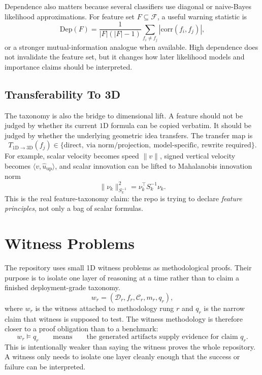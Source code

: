 \documentclass[11pt]{article}
\begin{document}
Dependence also matters because several classifiers use diagonal or naive-Bayes
likelihood approximations. For feature set \(F \subseteq \mathcal{F}\), a
useful warning statistic is
\begin{equation}
\mathrm{Dep}(F)
=
\frac{1}{|F|(|F|-1)}
\sum_{f_i \neq f_j}
\left|
\mathrm{corr}(f_i, f_j)
\right|,
\end{equation}
or a stronger mutual-information analogue when available. High dependence does
not invalidate the feature set, but it changes how later likelihood models and
importance claims should be interpreted.

\subsection*{Transferability To 3D}
The taxonomy is also the bridge to dimensional lift. A feature should not be
judged by whether its current \(1\text{D}\) formula can be copied verbatim.
It should be judged by whether the underlying geometric idea transfers. The
transfer map is
\begin{equation}
T_{1\mathrm{D}\rightarrow 3\mathrm{D}}(f_j)
\in
\{\text{direct},\ \text{via norm/projection},\ \text{model-specific},\ \text{rewrite required}\}.
\end{equation}
For example, scalar velocity becomes speed \(\|v\|\), signed vertical velocity
becomes \(\langle v, \hat{u}_{\mathrm{up}}\rangle\), and scalar innovation can
be lifted to Mahalanobis innovation norm
\begin{equation}
\|\nu_k\|_{S_k^{-1}}^2 = \nu_k^\top S_k^{-1}\nu_k.
\end{equation}
This is the real feature-taxonomy claim: the repo is trying to declare
\emph{feature principles}, not only a bag of scalar formulas.

\section{Witness Problems}
The repository uses small 1D witness problems as methodological proofs. Their purpose is to isolate one layer of reasoning at a time rather than to claim a finished deployment-grade taxonomy.
\begin{equation}
w_r = (\mathcal{D}_r, f_r, \mathcal{C}_r, m_r, q_r),
\end{equation}
where \(w_r\) is the witness attached to methodology rung \(r\) and \(q_r\) is
the narrow claim that witness is supposed to test. The witness methodology is
therefore closer to a proof obligation than to a benchmark:
\begin{equation}
w_r \models q_r
\qquad \text{means} \qquad
\text{the generated artifacts supply evidence for claim } q_r.
\end{equation}
This is intentionally weaker than saying the witness proves the whole
repository. A witness only needs to isolate one layer cleanly enough that the
success or failure can be interpreted.
\end{document}
